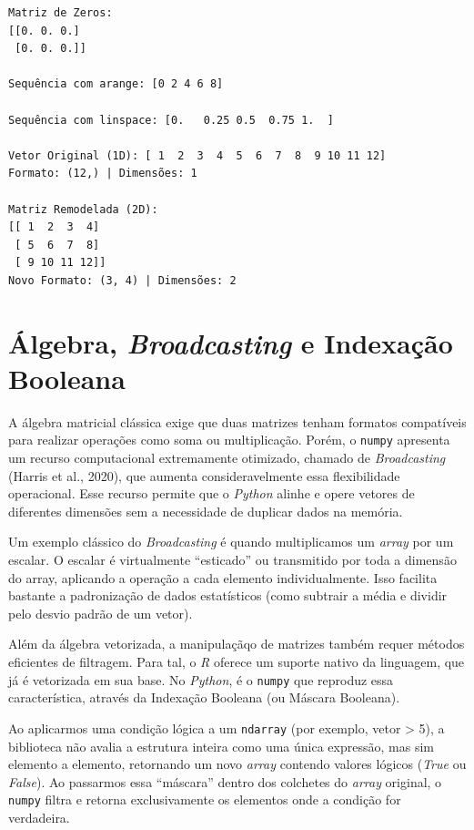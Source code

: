 \documentclass[
  brazilian,
  letterpaper,
  DIV=11,
  numbers=noendperiod]{scrreprt}
\begin{document}
\begin{verbatim}
Matriz de Zeros:
[[0. 0. 0.]
 [0. 0. 0.]]

Sequência com arange: [0 2 4 6 8]

Sequência com linspace: [0.   0.25 0.5  0.75 1.  ]

Vetor Original (1D): [ 1  2  3  4  5  6  7  8  9 10 11 12]
Formato: (12,) | Dimensões: 1

Matriz Remodelada (2D):
[[ 1  2  3  4]
 [ 5  6  7  8]
 [ 9 10 11 12]]
Novo Formato: (3, 4) | Dimensões: 2
\end{verbatim}

\section{\texorpdfstring{Álgebra, \emph{Broadcasting} e Indexação
Booleana}{Álgebra, Broadcasting e Indexação Booleana}}\label{uxe1lgebra-broadcasting-e-indexauxe7uxe3o-booleana}

A álgebra matricial clássica exige que duas matrizes tenham formatos
compatíveis para realizar operações como soma ou multiplicação. Porém, o
\texttt{numpy} apresenta um recurso computacional extremamente
otimizado, chamado de \emph{Broadcasting} (Harris et al., 2020), que
aumenta consideravelmente essa flexibilidade operacional. Esse recurso
permite que o \emph{Python} alinhe e opere vetores de diferentes
dimensões sem a necessidade de duplicar dados na memória.

Um exemplo clássico do \emph{Broadcasting} é quando multiplicamos um
\emph{array} por um escalar. O escalar é virtualmente ``esticado'' ou
transmitido por toda a dimensão do array, aplicando a operação a cada
elemento individualmente. Isso facilita bastante a padronização de dados
estatísticos (como subtrair a média e dividir pelo desvio padrão de um
vetor).

Além da álgebra vetorizada, a manipulaçãqo de matrizes também requer
métodos eficientes de filtragem. Para tal, o \emph{R} oferece um suporte
nativo da linguagem, que já é vetorizada em sua base. No \emph{Python},
é o \texttt{numpy} que reproduz essa característica, através da
Indexação Booleana (ou Máscara Booleana).

Ao aplicarmos uma condição lógica a um \texttt{ndarray} (por exemplo,
vetor \textgreater{} 5), a biblioteca não avalia a estrutura inteira
como uma única expressão, mas sim elemento a elemento, retornando um
novo \emph{array} contendo valores lógicos (\emph{True} ou
\emph{False}). Ao passarmos essa ``máscara'' dentro dos colchetes do
\emph{array} original, o \texttt{numpy} filtra e retorna exclusivamente
os elementos onde a condição for verdadeira.
\end{document}
